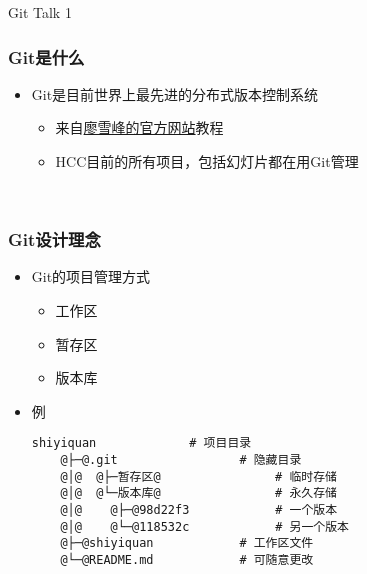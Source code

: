 

\usepackage{pmboxdraw}
\usepackage{newunicodechar}



\PreFirstFrame
\begin{frame} [fragile]
	\centerline{\fontsize{42}{42}\selectfont Git Talk 1}
\end{frame}
\PostFirstFrame

\begin{frame} [fragile]
	\frametitle{Git是什么}
	\linespread{1.5}
	\begin{itemize}
	\item Git是目前世界上最先进的分布式版本控制系统
		\begin{itemize}
		\item 来自\href{https://www.liaoxuefeng.com/wiki/896043488029600}
						{廖雪峰的官方网站}教程
		\item HCC目前的所有项目，包括幻灯片都在用Git管理
		\end{itemize}
	\end{itemize}
	
	\
	
	\centerline{}
\end{frame}

\begin{frame} [fragile]
	\frametitle{Git设计理念}
	\linespread{1.5}
	\begin{itemize}
	\item Git的项目管理方式
		\begin{itemize}
		\item 工作区
		\item 暂存区
		\item 版本库
		\end{itemize}
	\item 例
	\linespread{0}
	\begin{lstlisting}[style=bashstyle, gobble=4, texcl, escapechar=@]
	shiyiquan			  # 项目目录
	@├─@.git				 # 隐藏目录
	@│@  @├─暂存区@			    # 临时存储
	@│@  @└─版本库@			    # 永久存储
	@│@    @├─@98d22f3		      # 一个版本
	@│@    @└─@118532c		      # 另一个版本
	@├─@shiyiquan			 # 工作区文件
	@└─@README.md			 # 可随意更改
	\end{lstlisting}
	\linespread{1.5}
	\end{itemize}
\end{frame}

